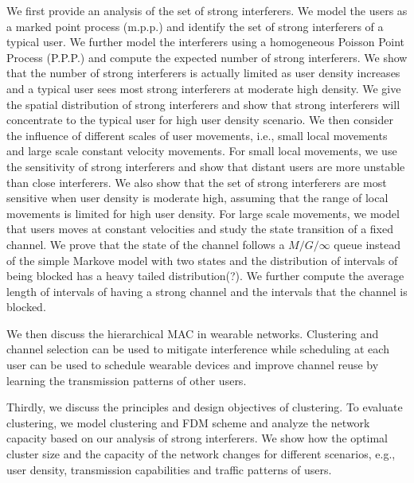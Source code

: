 \documentclass[10pt, conference, letterpaper]{IEEEtran}
\begin{document}
We first provide an analysis of the set of strong interferers. We model the users as a marked point process (m.p.p.) and identify the set of strong interferers of a typical user. We further model the interferers using a homogeneous Poisson Point Process (P.P.P.) and compute the expected number of strong interferers. We show that the number of strong interferers is actually limited as user density increases and a typical user sees most strong interferers at moderate high density. We give the spatial distribution of strong interferers and show that strong interferers will concentrate to the typical user for high user density scenario. We then consider the influence of different scales of user movements, i.e., small local movements and large scale constant velocity movements. For small local movements, we use the sensitivity of strong interferers and show that distant users are more unstable than close interferers. We also show that the set of strong interferers are most sensitive when user density is moderate high, assuming that the range of local movements is limited for high user density. For large scale movements, we model that users moves at constant velocities and study the state transition of a fixed channel. We prove that the state of the channel follows a $M/G/\infty$ queue instead of the simple Markove model with two states and the distribution of intervals of being blocked has a heavy tailed distribution(?). We further compute the average length of intervals of having a strong channel  and the intervals that the channel is blocked.


We then discuss the hierarchical MAC in wearable networks. Clustering and channel selection can be used to mitigate interference while scheduling at each user can be used to schedule wearable devices and improve channel reuse by learning the transmission patterns of other users.

Thirdly, we discuss the principles and design objectives of clustering. To evaluate clustering, we model clustering and FDM scheme and analyze the network capacity based on our analysis of strong interferers. We show how the optimal cluster size and the capacity of the network changes for different scenarios, e.g., user density, transmission capabilities and traffic patterns of users.


\end{document}
